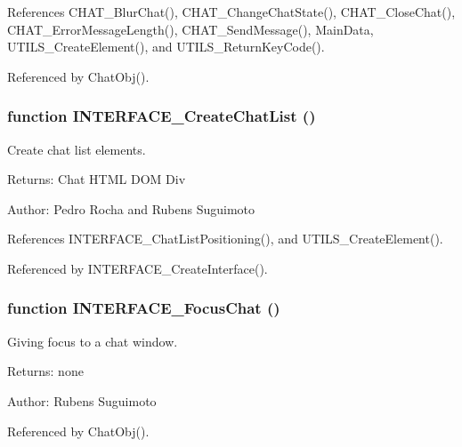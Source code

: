 References CHAT\_\-BlurChat(), CHAT\_\-ChangeChatState(), CHAT\_\-CloseChat(), CHAT\_\-ErrorMessageLength(), CHAT\_\-SendMessage(), MainData, UTILS\_\-CreateElement(), and UTILS\_\-ReturnKeyCode().

Referenced by ChatObj().
\subsubsection[INTERFACE\_\-CreateChatList]{\setlength{\rightskip}{0pt plus 5cm}function INTERFACE\_\-CreateChatList ()}\label{interface_2chat_8js_ca21f0f567fc5a0eb6fc537becd06645}


Create chat list elements. 

\begin{Desc}
\item[Returns:]Chat HTML DOM Div \end{Desc}
\begin{Desc}
\item[Author:]Pedro Rocha and Rubens Suguimoto \end{Desc}


References INTERFACE\_\-ChatListPositioning(), and UTILS\_\-CreateElement().

Referenced by INTERFACE\_\-CreateInterface().
\subsubsection[INTERFACE\_\-FocusChat]{\setlength{\rightskip}{0pt plus 5cm}function INTERFACE\_\-FocusChat ()}\label{interface_2chat_8js_870cd8ce01d1652d4648307b0c04518e}


Giving focus to a chat window. 

\begin{Desc}
\item[Returns:]none \end{Desc}
\begin{Desc}
\item[Author:]Rubens Suguimoto \end{Desc}


Referenced by ChatObj().
